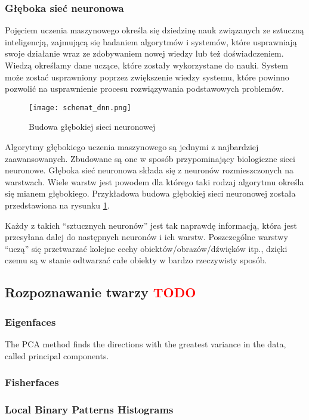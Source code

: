 \subsubsection{Głęboka sieć neuronowa} \label{dnn}
Pojęciem uczenia maszynowego określa się dziedzinę nauk związanych ze sztuczną inteligencją, zajmującą się badaniem algorytmów i systemów, które usprawniają swoje działanie wraz ze zdobywaniem nowej wiedzy lub też doświadczeniem. Wiedzą określamy dane uczące, które zostały wykorzystane do nauki. System może zostać usprawniony poprzez zwiększenie wiedzy systemu, które powinno pozwolić na usprawnienie procesu rozwiązywania podstawowych problemów.
\begin{figure}[H]
	\centering
	\texttt{[image: schemat\_dnn.png]}
	\caption{Budowa głębokiej sieci neuronowej}
	\label{fig:budowa_dnn}
\end{figure}
Algorytmy głębokiego uczenia maszynowego są jednymi z najbardziej zaawansowanych. Zbudowane są one w sposób przypominający biologiczne sieci neuronowe. Głęboka sieć neuronowa składa się z neuronów rozmieszczonych na warstwach. Wiele warstw jest powodem dla którego taki rodzaj algorytmu określa się mianem głębokiego. Przykładowa budowa głębokiej sieci neuronowej została przedstawiona na rysunku \ref{fig:budowa_dnn}.

Każdy z takich “sztucznych neuronów” jest tak naprawdę informacją, która jest przesyłana dalej do następnych neuronów i ich warstw. Poszczególne warstwy “uczą” się przetwarzać kolejne cechy obiektów/obrazów/dźwięków itp., dzięki czemu są w stanie odtwarzać całe obiekty w bardzo rzeczywisty sposób.

\subsection{Rozpoznawanie twarzy \textcolor{red}{TODO}}
\subsubsection{Eigenfaces} \label{eigen}
The PCA method finds the directions with the greatest variance in the data, called principal components.
\subsubsection{Fisherfaces} \label{fisher}
\subsubsection{Local Binary Patterns Histograms} \label{lbph}

